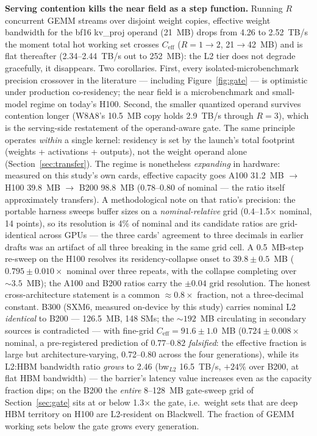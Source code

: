 \documentclass[10pt,twocolumn]{article}
\begin{document}
\textbf{Serving contention kills the near field as a step function.}
Running $R$ concurrent GEMM streams over disjoint weight copies, effective weight bandwidth for the bf16 kv\_proj operand (21~MB) drops from 4.26 to 2.52~TB/s the moment total hot working set crosses $C_\text{eff}$ ($R{=}1\!\to\!2$, 21$\to$42~MB) and is flat thereafter (2.34--2.44~TB/s out to 252~MB): the L2 tier does not degrade gracefully, it disappears.  Two corollaries.  First, every isolated-microbenchmark precision crossover in the literature --- including Figure~\ref{fig:gate} --- is optimistic under production co-residency; the near field is a microbenchmark and small-model regime on today's H100.  Second, the smaller quantized operand survives contention longer (W8A8's 10.5~MB copy holds 2.9~TB/s through $R{=}3$), which is the serving-side restatement of the operand-aware gate.  The same principle operates \emph{within} a single kernel: residency is set by the launch's total footprint (weights + activations + outputs), not the weight operand alone (Section~\ref{sec:transfer}).  The regime is nonetheless \emph{expanding} in hardware: measured on this study's own cards, effective capacity goes A100 31.2~MB $\to$ H100 39.8~MB $\to$ B200 98.8~MB (0.78--0.80 of nominal --- the ratio itself approximately transfers).  A methodological note on that ratio's precision: the portable harness sweeps buffer sizes on a \emph{nominal-relative} grid (0.4--1.5$\times$ nominal, 14 points), so its resolution is 4\% of nominal and its candidate ratios are grid-identical across GPUs --- the three cards' agreement to three decimals in earlier drafts was an artifact of all three breaking in the same grid cell.  A 0.5~MB-step re-sweep on the H100 resolves its residency-collapse onset to $39.8 \pm 0.5$~MB ($0.795 \pm 0.010\times$ nominal over three repeats, with the collapse completing over ${\sim}3.5$~MB); the A100 and B200 ratios carry the $\pm 0.04$ grid resolution.  The honest cross-architecture statement is a common ${\approx}0.8\times$ fraction, not a three-decimal constant.  B300 (SXM6, measured on-device by this study) carries nominal L2 \emph{identical} to B200 --- 126.5~MB, 148 SMs; the ${\sim}192$~MB circulating in secondary sources is contradicted --- with fine-grid $C_\text{eff}=91.6\pm1.0$~MB ($0.724\pm0.008\times$ nominal, a pre-registered prediction of $0.77$--$0.82$ \emph{falsified}: the effective fraction is large but architecture-varying, 0.72--0.80 across the four generations), while its L2:HBM bandwidth ratio \emph{grows} to 2.46 (bw$_{L2}$ 16.5~TB/s, $+24\%$ over B200, at flat HBM bandwidth) --- the barrier's latency value increases even as the capacity fraction dips; on the B200 the \emph{entire} 8--128~MB gate-sweep grid of Section~\ref{sec:gate} sits at or below 1.3$\times$ the gate, i.e.\ weight sets that are deep HBM territory on H100 are L2-resident on Blackwell.  The fraction of GEMM working sets below the gate grows every generation.
\end{document}
